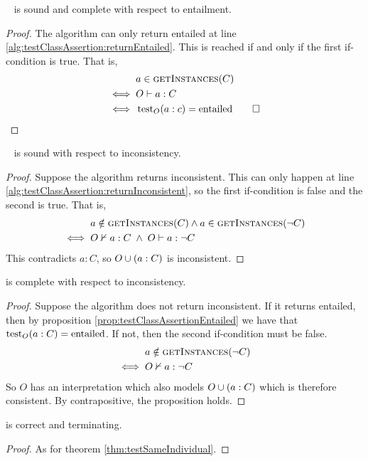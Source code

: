 \documentclass[paper.tex]{subfiles}
\begin{document}
\begin{proposition}
  \label{prop:testClassAssertionEntailed}
  \sloppy~
   is sound and complete with respect to entailment.
\end{proposition}
\begin{proof}
  The algorithm can only return entailed at line \ref{alg:testClassAssertion:returnEntailed}.  This is reached if and only if the first if-condition is true.  That is,
  \begin{align*}
    & a \in \Call{getInstances}{C} \\
    \iff{}& O \sementails a : C \\
    \iff{}& \test_O(a : c) = \entailed \qed
  \end{align*}
\end{proof}

\begin{proposition}
  \sloppy~
   is sound with respect to inconsistency.
\end{proposition}
\begin{proof}
  Suppose the algorithm returns inconsistent.  This can only happen at line \ref{alg:testClassAssertion:returnInconsistent}, so the first if-condition is false and the second is true.  That is,
  \begin{align*}
    & a \notin \Call{getInstances}{C} \land a \in \Call{getInstances}{\neg C} \\
    \iff{}& O \nsementails a : C \;\land\; O \sementails a : \neg C
  \end{align*}
  This contradicts $a : C$, so $O \cup (a : C)$ is inconsistent.
\end{proof}

\begin{proposition}
   is complete with respect to inconsistency.
\end{proposition}
\begin{proof}
  Suppose the algorithm does not return inconsistent.  If it returns entailed, then by proposition \ref{prop:testClassAssertionEntailed} we have that $\operatorname{test}_O(a : C) = \mathrm{entailed}$.  If not, then the second if-condition must be false.
  \begin{align*}
    & a \notin \Call{getInstances}{\neg C} \\
    \iff{}& O \nsementails a : \neg C
  \end{align*}
  So $O$ has an interpretation which also models $O \cup (a : C)$ which is therefore consistent.  By contrapositive, the proposition holds.
\end{proof}

\begin{theorem}
   is correct and terminating.
\end{theorem}
\begin{proof}
  As for theorem \ref{thm:testSameIndividual}.
\end{proof}
\end{document}
